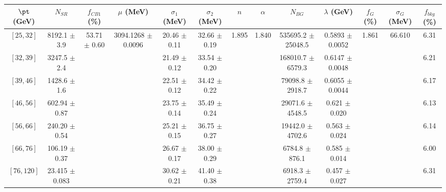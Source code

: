 \begin{tabular}{c||c|c|c|c|c|c|c|c|c|c|c||c}
$\pt$ (GeV) & $N_{SR}$ & $f_{CB1}$ (\%) & $\mu$ (MeV) & $\sigma_1$ (MeV) & $\sigma_2$ (MeV) & $n$ & $\alpha$ & $N_{BG}$ & $\lambda$ (GeV) & $f_G$ (\%) & $\sigma_G$ (MeV) & $f_{bkg}$ (\%) \\
\hline
$[25, 32]$ & 8192.1 $\pm$ 3.9 & \multirow{7}{*}{53.71 $\pm$ 0.60} & \multirow{7}{*}{3094.1268 $\pm$ 0.0096} & 20.46 $\pm$ 0.11 & 32.66 $\pm$ 0.19 & \multirow{7}{*}{1.895} & \multirow{7}{*}{1.840} & 535695.2 $\pm$ 25048.5 & 0.5893 $\pm$ 0.0052 & \multirow{7}{*}{1.861} & \multirow{7}{*}{66.610} & 6.31\\
$[32, 39]$ & 3247.5 $\pm$ 2.4 &  &  & 21.49 $\pm$ 0.12 & 33.54 $\pm$ 0.20 &  &  & 168010.7 $\pm$ 6579.3 & 0.6147 $\pm$ 0.0048 &  &  & 6.21\\
$[39, 46]$ & 1428.6 $\pm$ 1.6 &  &  & 22.51 $\pm$ 0.12 & 34.42 $\pm$ 0.22 &  &  & 79098.8 $\pm$ 2918.7 & 0.6055 $\pm$ 0.0044 &  &  & 6.17\\
$[46, 56]$ & 602.94 $\pm$ 0.87 &  &  & 23.75 $\pm$ 0.14 & 35.49 $\pm$ 0.24 &  &  & 29071.6 $\pm$ 4548.5 & 0.621 $\pm$ 0.020 &  &  & 6.13\\
$[56, 66]$ & 240.20 $\pm$ 0.54 &  &  & 25.21 $\pm$ 0.15 & 36.75 $\pm$ 0.27 &  &  & 19442.0 $\pm$ 4702.6 & 0.563 $\pm$ 0.024 &  &  & 6.14\\
$[66, 76]$ & 106.19 $\pm$ 0.37 &  &  & 26.67 $\pm$ 0.17 & 38.00 $\pm$ 0.29 &  &  & 6784.8 $\pm$ 876.1 & 0.585 $\pm$ 0.014 &  &  & 6.00\\
$[76, 120]$ & 23.415 $\pm$ 0.083 &  &  & 30.62 $\pm$ 0.21 & 41.40 $\pm$ 0.38 &  &  & 6918.3 $\pm$ 2759.4 & 0.457 $\pm$ 0.027 &  &  & 6.31\\
\end{tabular}
